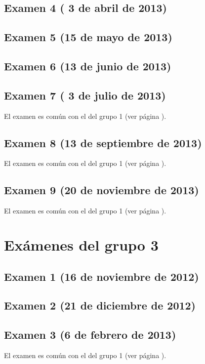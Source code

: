 \documentclass[a4paper,12pt,twoside]{book}
\begin{document}
\section{Examen 4 ( 3 de abril de 2013)}
\section{Examen 5 (15 de mayo de 2013)}
\section{Examen 6 (13 de junio de 2013)} 
\label{examen_12_13_1_6}
\section{Examen 7 ( 3 de julio de 2013)} 
El examen es común con el del grupo 1 (ver página \pageref{examen_12_13_1_7}).
\section{Examen 8 (13 de septiembre de 2013)} 
El examen es común con el del grupo 1 (ver página \pageref{examen_12_13_1_8}).
\section{Examen 9 (20 de noviembre de 2013)} 
El examen es común con el del grupo 1 (ver página \pageref{examen_12_13_1_9}).

\chapter{Exámenes del grupo 3}
\section{Examen 1 (16 de noviembre de 2012)}
\section{Examen 2 (21 de diciembre de 2012)}
\section{Examen 3 (6 de febrero de 2013)}
El examen es común con el del grupo 1 (ver página \pageref{examen_12_13_1_3}).
\end{document}
